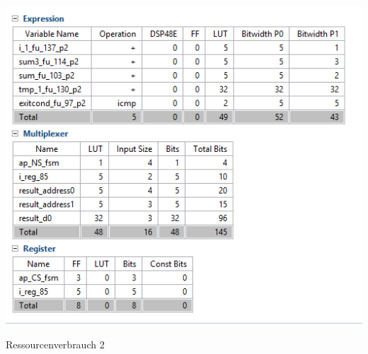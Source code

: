 \begin{minipage}{\textwidth}
    \begin{center}        
        \includegraphics[scale=1.0]{img/fibo2.png} 
    \end{center}
\end{minipage}
\begin{center}
Ressourcenverbrauch 2
\end{center}



